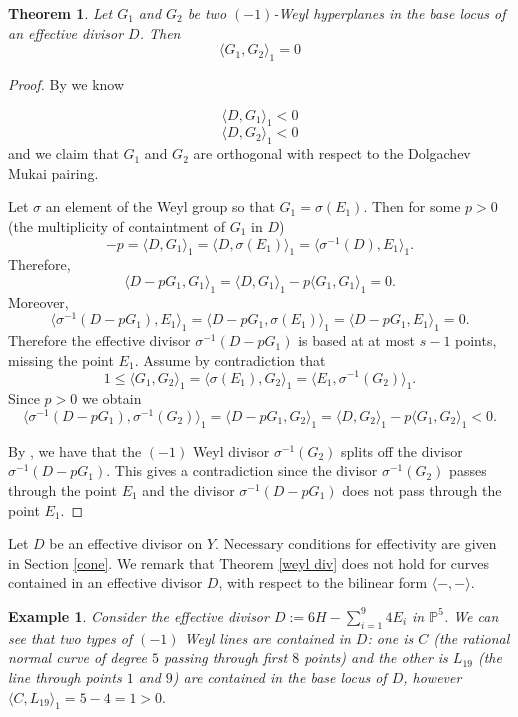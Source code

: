 \documentclass[12pt]{article}
\newtheorem{theorem}[equation]{Theorem}
\newtheorem{example}[equation]{Example}
\numberwithin{equation}{section}
\numberwithin{subeq}{equation}
\begin{document}
\begin{theorem}\label{weyl div}
Let  $G_1$ and $G_2$ be two $(-1)$-Weyl hyperplanes in the base locus of an effective divisor $D$. Then
$$\langle  G_1, G_2\rangle_1 =0$$
\end{theorem}

\begin{proof}
By \cite[Lemma 7.1]{DP} we know

$$\langle  D, G_1\rangle_1 <0$$
$$\langle D, G_2\rangle_1 <0$$
and we claim that $G_1$ and $G_2$ are orthogonal with respect to the Dolgachev Mukai pairing.

Let $\sigma$ an element of the Weyl group so that $G_1=\sigma(E_1)$.
Then for some $p>0$ (the multiplicity of containtment of $G_1$ in $D$)
\[
-p= \langle D, G_1\rangle_1 = \langle D, \sigma(E_1)\rangle_1 =\langle \sigma^{-1}(D), E_1\rangle_1.
\]
Therefore,
$$
\langle D-pG_1, G_1\rangle_1 =\langle D, G_1\rangle_1 -p \langle G_1, G_1\rangle_1 =0.
$$
 Moreover,
$$
\langle \sigma^{-1}(D - p G_1), E_1\rangle_1 = \langle  D - pG_1, \sigma(E_1)\rangle_1 = \langle D - p G_1, E_1\rangle_1=0.
$$
Therefore the effective divisor $\sigma^{-1}(D - p G_1)$ is based at at most $s-1$ points,
missing the point $E_1$.
Assume by contradiction that 
$$
1\leq  \langle G_1, G_2\rangle_1 = \langle \sigma(E_1), G_2\rangle_1 =\langle E_1, \sigma^{-1}(G_2)\rangle_1.
$$
Since $p>0$ we obtain
$$ \langle  \sigma^{-1}(D - p G_1), \sigma^{-1}(G_2)\rangle_1 = \langle D - pG_1, G_2\rangle_1 =\langle D, G_2\rangle_1 - p\langle G_1, G_2\rangle_1 <0.
$$

By \cite[Lemma 7.1]{DP},
we have that the $(-1)$ Weyl divisor $\sigma^{-1}(G_2)$
splits off the divisor $\sigma^{-1}(D-pG_1)$.
This gives a contradiction since the divisor $\sigma^{-1}(G_2)$
passes through the point $E_1$ 
and the divisor $\sigma^{-1}(D-pG_1)$ does not pass through the point $E_1$.

\end{proof}

Let $D$ be an effective divisor on $Y$.
Necessary conditions for effectivity are given in Section \eqref{cone}.
We remark that Theorem \eqref{weyl div}
does not hold for curves contained in an effective divisor $D$,
with respect to the bilinear form $\langle -,-\rangle$.

\begin{example}\label{examp}
Consider the effective divisor $D:=6H -\sum_{i=1}^9 4E_i$ in $\mathbb{P}^5$.
We can see that two types of $(-1)$ Weyl lines are contained in $D$:
one is $C$ (the rational normal curve of degree $5$ passing through first $8$ points)
and the other is $L_{19}$ (the line through points $1$ and $9$)
are contained in the base locus of $D$,
however $\langle C, L_{19} \rangle_1=5-4=1>0.$
\end{example}
\end{document}

